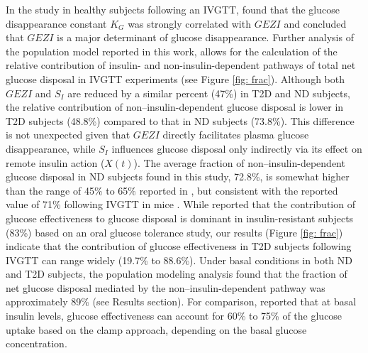 \documentclass[utf8]{frontiersSCNS} %
\begin{document}
In the study in healthy subjects following an IVGTT, \cite{Kahn_1994} found that the glucose disappearance constant $K_G$ was strongly correlated with $GEZI$ and concluded that $GEZI$ is a major determinant of glucose disappearance. Further analysis of the population model reported in this work, allows for the calculation of the relative contribution of insulin- and non-insulin-dependent pathways of total net glucose disposal in IVGTT experiments (see Figure \ref{fig: frac}). Although both $GEZI$ and $S_I$ are reduced by a similar percent (47\%) in T2D and ND subjects, the relative contribution of non–insulin-dependent glucose disposal is lower in T2D subjects (48.8\%) compared to that in ND subjects (73.8\%). This difference is not unexpected given that $GEZI$ directly facilitates plasma glucose disappearance, while $S_I$ influences glucose disposal only indirectly via its effect on remote insulin action ($X(t)$). The average fraction of non–insulin-dependent glucose disposal in ND subjects found in this study, 72.8\%, is somewhat higher than the range of 45\% to 65\% reported in \citet{Alford_2018}, but consistent with the reported value of 71\%  following IVGTT in mice \citep{PACINI_2001}. While \citet{Best1996} reported that the contribution of glucose effectiveness to glucose disposal is dominant in insulin-resistant subjects (83\%) based on an oral glucose tolerance study, our results (Figure \ref{fig: frac}) indicate that the contribution of glucose effectiveness in T2D subjects following IVGTT can range widely (19.7\% to 88.6\%). Under basal conditions in both ND and T2D subjects, the population modeling analysis found that the fraction of net glucose disposal mediated by the non–insulin-dependent pathway was approximately 89\% (see Results section). For comparison, \citet{Best1996} reported that at basal insulin levels, glucose effectiveness can account for 60\% to 75\% of the glucose uptake based on the clamp approach, depending on the basal glucose concentration.
\end{document}
